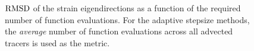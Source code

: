\begin{figure}[htpb]
    \centering
    
    \caption[$\rmsd$ of the strain eigendirections as a function of the required
    number of function evaluations]{
    $\rmsd$ of the strain eigendirections as a function of the required number
    of function evaluations. For the adaptive stepsize methods, the
    \emph{average} number of function evaluations across all advected tracers
    is used as the metric.}
    \label{fig:xi2_err_both}
\end{figure}
